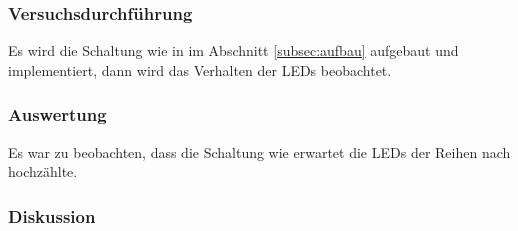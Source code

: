 \documentclass[12pt,a4paper]{article}
\begin{document}
\subsubsection*{Versuchsdurchführung}

Es wird die Schaltung wie in im Abschnitt \ref{subsec:aufbau} aufgebaut und implementiert, dann wird das Verhalten der LEDs beobachtet.

\subsubsection*{Auswertung}

Es war zu beobachten, dass die Schaltung wie erwartet die LEDs der Reihen nach hochzählte.

\subsubsection*{Diskussion}
\end{document}
